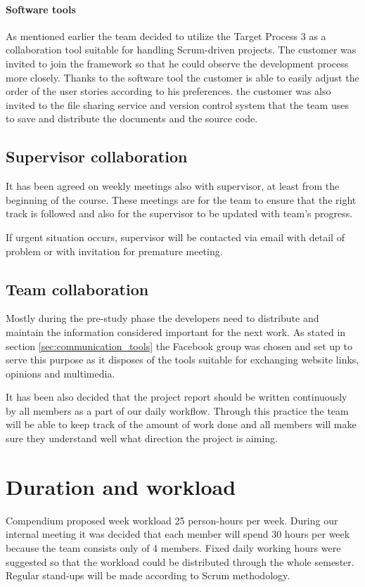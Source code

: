\paragraph{Software tools}
As mentioned earlier the team decided to utilize the Target Process 3 as a collaboration tool suitable for handling Scrum-driven projects. The customer was invited to join the framework so that he could observe the development process more closely. Thanks to the software tool the customer is able to easily adjust the order of the user stories according to his preferences. the customer was also invited to the file sharing service and version control system that the team uses to save and distribute the documents and the source code.

\subsection{Supervisor collaboration}
It has been agreed on weekly meetings also with supervisor, at least from the beginning of the course.
These meetings are for the team to ensure that the right track is followed and also for the supervisor to be updated with team's progress.

If urgent situation occurs, supervisor will be contacted via email with detail of problem or with invitation for premature meeting.

\subsection{Team collaboration}
Mostly during the pre-study phase the developers need to distribute and maintain the information considered important for the next work. As stated in section \ref{sec:communication_tools} the Facebook group was chosen and set up to serve this purpose as it disposes of the tools suitable for exchanging website links, opinions and multimedia.

It has been also decided that the project report should be written continuously by all members as a part of our daily workflow. Through this practice the team will be able to keep track of the amount of work done and all members will make sure they understand well what direction the project is aiming.

\section{Duration and workload}
\label{sec:duration_and_workload}
Compendium proposed week workload 25 person-hours per week. 
During our internal meeting it was decided that each member will spend 30 hours per week because the team consists only of 4 members. 
Fixed daily working hours were suggested so that the workload could be distributed through the whole semester.
Regular stand-ups will be made according to Scrum methodology.

